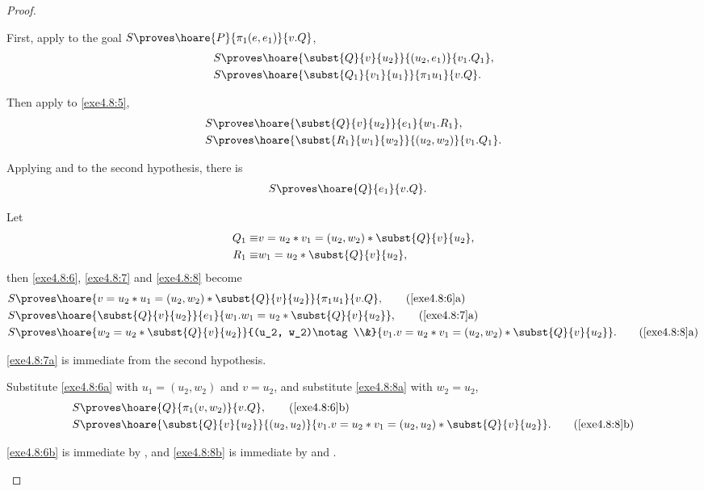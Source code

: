 \begin{proof}
\begin{enumerate}
  First, apply  to the goal $S \proves \hoare{P}
  {\pi_1(e, e_1)}{v.Q}$,
  \begin{align}
    S \proves & \hoare{\subst{Q}{v}{u_2}}{(u_2, e_1)}{v_1.Q_1}, \label{exe4.8:5} \\
    S \proves & \hoare{\subst{Q_1}{v_1}{u_1}}{\pi_1 u_1}{v.Q}. \label{exe4.8:6}
  \end{align}

  Then apply  to \eqref{exe4.8:5},
  \begin{align}
    S \proves & \hoare{\subst{Q}{v}{u_2}}{e_1}{w_1.R_1}, \label{exe4.8:7} \\
    S \proves & \hoare{\subst{R_1}{w_1}{w_2}}{(u_2, w_2)}{v_1.Q_1}. \label{exe4.8:8}
  \end{align}

  Applying  and  to the
  second hypothesis, there is
  \begin{align*}
    S \proves & \hoare{Q}{e_1}{v.Q}.
  \end{align*}

  Let
  \begin{align*}
    Q_1 \equiv & v = u_2 * v_1 = (u_2, w_2) * \subst{Q}{v}{u_2}, \\
    R_1 \equiv & w_1 = u_2 * \subst{Q}{v}{u_2},
  \end{align*}
  then \eqref{exe4.8:6}, \eqref{exe4.8:7} and \eqref{exe4.8:8} become
  \begin{align}
    S \proves &
    \hoare{v = u_2 * u_1 = (u_2, w_2) * \subst{Q}{v}{u_2}}{\pi_1 u_1}{v.Q},
    \tag{\ref{exe4.8:6}a} \label{exe4.8:6a} \\
    S \proves & \hoare{\subst{Q}{v}{u_2}}{e_1}{w_1.w_1 = u_2 * \subst{Q}{v}{u_2}},
    \tag{\ref{exe4.8:7}a} \label{exe4.8:7a} \\
    S \proves & \hoare{w_2 = u_2 * \subst{Q}{v}{u_2}}{(u_2, w_2)\notag \\&}
    {v_1.v = u_2 * v_1 = (u_2, w_2) * \subst{Q}{v}{u_2}}.
    \tag{\ref{exe4.8:8}a} \label{exe4.8:8a}
  \end{align}

  \eqref{exe4.8:7a} is immediate from the second hypothesis.

  Substitute \eqref{exe4.8:6a} with $u_1 = (u_2, w_2)$ and $v = u_2$, and
  substitute \eqref{exe4.8:8a} with $w_2 = u_2$,
  \begin{align}
    S \proves &
    \hoare{Q}{\pi_1 (v, w_2)}{v.Q}, \tag{\ref{exe4.8:6}b} \label{exe4.8:6b} \\
    S \proves & \hoare{\subst{Q}{v}{u_2}}{(u_2, u_2)}
    {v_1.v = u_2 * v_1 = (u_2, u_2) * \subst{Q}{v}{u_2}}.
    \tag{\ref{exe4.8:8}b} \label{exe4.8:8b}
  \end{align}

  \eqref{exe4.8:6b} is immediate by , and
  \eqref{exe4.8:8b} is immediate by  and
  .
  \end{enumerate}
\end{proof}

